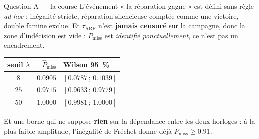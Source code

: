 \documentclass[aspectratio=169,11pt]{beamer}
\begin{document}
\begin{frame}{\hfill Question A --- la course}
  \small
  L'événement « la réparation gagne » est défini sans règle \emph{ad hoc} :
  inégalité stricte, réparation silencieuse comptée comme une victoire,
  double famine exclue. Et $\tau_{\mathrm{ARF}}$ n'est \textbf{jamais censuré} sur
  la campagne, donc la zone d'indécision est vide : $P_{\mathrm{miss}}$ est
  \emph{identifié ponctuellement}, ce n'est pas un encadrement.

  \vspace{0.6em}
  \begin{center}
    \begin{tabular}{crl}
      \toprule
      seuil $\lambda$ & $\hat P_{\mathrm{miss}}$ & Wilson 95~\% \\
      \midrule
      $8$  & $\num{0.0905}$ & $[\num{0.0787}\,;\,\num{0.1039}]$ \\
      $25$ & $\num{0.9715}$ & $[\num{0.9633}\,;\,\num{0.9779}]$ \\
      $50$ & $\num{1.0000}$ & $[\num{0.9981}\,;\,\num{1.0000}]$ \\
      \bottomrule
    \end{tabular}
  \end{center}

  \vspace{0.6em}
  Et une borne qui ne suppose \textbf{rien} sur la dépendance entre les deux
  horloges : à la plus faible amplitude, l'inégalité de Fréchet donne déjà
  $P_{\mathrm{miss}} \ge \num{0.91}$.
\end{frame}
\end{document}

